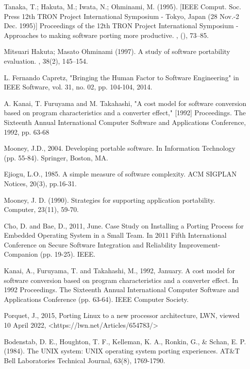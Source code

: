 \begin{flushleft}
    \begin{thebibliography}{99}

     Tanaka, T.; Hakuta, M.; Iwata, N.; Ohminami, M. (1995). [IEEE Comput. Soc. Press 12th TRON Project International Symposium - Tokyo, Japan (28 Nov.-2 Dec. 1995)] Proceedings of the 12th TRON Project International Symposium - Approaches to making software porting more productive. , (), 73–85.

     Mitsuari Hakuta; Masato Ohminami (1997). A study of software portability evaluation. , 38(2), 145–154.

     L. Fernando Capretz, "Bringing the Human Factor to Software Engineering" in IEEE Software, vol. 31, no. 02, pp. 104-104, 2014.

     A. Kanai, T. Furuyama and M. Takahashi, "A cost model for software conversion based on program characteristics and a converter effect," [1992] Proceedings. The Sixteenth Annual International Computer Software and Applications Conference, 1992, pp. 63-68

     Mooney, J.D., 2004. Developing portable software. In Information Technology (pp. 55-84). Springer, Boston, MA.

     Ejiogu, L.O., 1985. A simple measure of software complexity. ACM SIGPLAN Notices, 20(3), pp.16-31.

     Mooney, J. D. (1990). Strategies for supporting application portability. Computer, 23(11), 59-70.

     Cho, D. and Bae, D., 2011, June. Case Study on Installing a Porting Process for Embedded Operating System in a Small Team. In 2011 Fifth International Conference on Secure Software Integration and Reliability Improvement-Companion (pp. 19-25). IEEE.

     Kanai, A., Furuyama, T. and Takahashi, M., 1992, January. A cost model for software conversion based on program characteristics and a converter effect. In 1992 Proceedings. The Sixteenth Annual International Computer Software and Applications Conference (pp. 63-64). IEEE Computer Society.

    Porquet, J., 2015,
    Porting Linux to a new processor architecture,
    LWN,
    viewed 10 April 2022,
    <https://lwn.net/Articles/654783/>

    Bodenstab, D. E., Houghton, T. F., Kelleman, K. A., Ronkin, G., \& Schan, E. P. (1984).
    The UNIX system: UNIX operating system porting experiences.
    AT\&T Bell Laboratories Technical Journal, 63(8), 1769-1790.


\end{thebibliography}
\end{flushleft}
